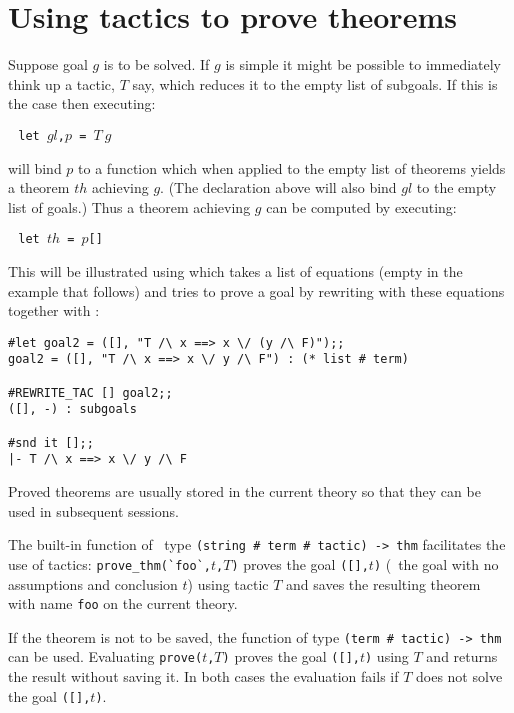 \section{Using tactics to prove theorems}
\label{using-tactics}

Suppose goal $g$  is to be solved. If $g$
is simple it might be possible
to immediately think up a tactic, $T$
say, which reduces it to the empty list of
subgoals. If this is the case then executing:


$\ ${\small\verb| let |}$gl${\small\verb|,|}$p${\small\verb| = |}$T\ g$


\noindent will bind $p$ to a function which when applied to the empty list
of theorems yields a theorem $th$ achieving $g$.
(The declaration above
will also bind $gl$ to the empty list of goals.) Thus a theorem achieving
$g$ can be computed by executing:

$\ ${\small\verb| let |}$th${\small\verb| = |}$p${\small\verb|[]|}


\noindent This will be illustrated using  which takes a list
of equations (empty in the example that follows) and tries to prove a goal
by rewriting with these equations together with
:

\begin{session}\begin{verbatim}
#let goal2 = ([], "T /\ x ==> x \/ (y /\ F)");;
goal2 = ([], "T /\ x ==> x \/ y /\ F") : (* list # term)

#REWRITE_TAC [] goal2;;
([], -) : subgoals

#snd it [];;
|- T /\ x ==> x \/ y /\ F
\end{verbatim}\end{session}

\noindent Proved theorems are usually stored in the current theory
so that
they can be used in subsequent sessions.

The built-in function
  of
\ML\ type {\small\verb|(string # term # tactic) -> thm|} facilitates the use
of tactics:
{\small\verb|prove_thm(`foo`,|}$t${\small\verb|,|}$T${\small\verb|)|} proves
the goal   {\small\verb|([],|}$t${\small\verb|)|}   (\ie\  the   goal  with  no
assumptions and  conclusion  $t$)  using  tactic  $T$  and  saves the resulting
theorem with name {\small\verb|foo|} on the current theory.

If the theorem is not to be saved, the function  of type
{\small\verb|(term # tactic) -> thm|} can be used.  Evaluating
{\small\verb|prove(|}$t${\small\verb|,|}$T${\small\verb|)|} proves   the   goal
{\small\verb|([],|}$t${\small\verb|)|} using $T$ and returns the result without
saving it.  In both cases  the evaluation  fails if  $T$ does  not solve the
goal {\small\verb|([],|}$t${\small\verb|)|}.


